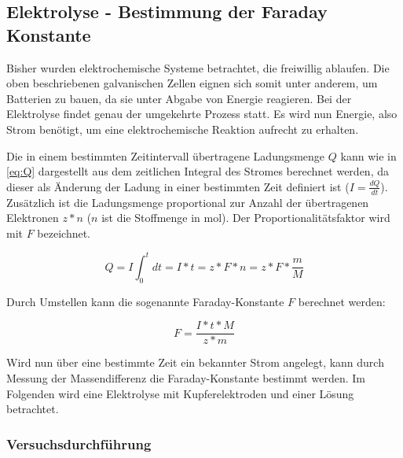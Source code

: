 \documentclass{article}
\begin{document}
    \pagebreak
    
    \subsection{Elektrolyse - Bestimmung der Faraday Konstante}
    
      Bisher wurden elektrochemische Systeme betrachtet, die freiwillig ablaufen. Die oben beschriebenen galvanischen Zellen eignen sich somit unter anderem, um Batterien zu bauen, da sie unter Abgabe von Energie reagieren. Bei der Elektrolyse findet genau der umgekehrte Prozess statt. Es wird nun Energie, also Strom benötigt, um eine elektrochemische Reaktion aufrecht zu erhalten. 
      
      Die in einem bestimmten Zeitintervall übertragene Ladungsmenge $Q$ kann wie in \eqref{eq:Q} dargestellt aus dem zeitlichen Integral des Stromes berechnet werden, da dieser als Änderung der Ladung in einer bestimmten Zeit definiert ist ($I=\frac{dQ}{dt}$). Zusätzlich ist die Ladungsmenge proportional zur Anzahl der übertragenen Elektronen $z * n$ ($n$ ist die Stoffmenge in mol). Der Proportionalitätsfaktor wird mit $F$ bezeichnet.
      
      \begin{equation}
        Q = I \int_{0}^{t} dt = I * t = z * F * n = z * F * \frac{m}{M} \label{eq:Q}
      \end{equation}
      
      Durch Umstellen kann die sogenannte Faraday-Konstante $F$ berechnet werden:
      
      \begin{equation}
        F = \frac{I * t * M}{z * m} \label{eq:Faraday}
      \end{equation}
      
      Wird nun über eine bestimmte Zeit ein bekannter Strom angelegt, kann durch Messung der Massendifferenz die Faraday-Konstante bestimmt werden. Im Folgenden wird eine Elektrolyse mit Kupferelektroden und einer  Lösung betrachtet. 
      
      \subsubsection{Versuchsdurchführung}
        
\end{document}
